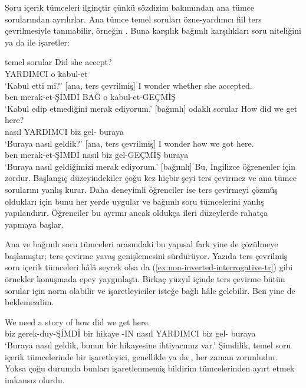 \label{sec:sub-interrog-tr}

Soru içerik tümceleri ilginçtir çünkü sözdizim bakımından ana tümce sorularından ayrılırlar. Ana tümce temel soruları özne-yardımcı fiil ters çevrilmesiyle tanınabilir, örneğin . Buna karşılık bağımlı karşılıkları soru niteliğini  ya da  ile işaretler:

\ea temel sorular\label{ex:int-sub-tr}
    \ea \gll Did she accept?\\
        YARDIMCI o kabul-et\\
    \glt `Kabul etti mi?' [ana, ters çevrilmiş]
    \ex \gll I wonder {\ob}whether she accepted{\cb}.\\
        ben merak-et-ŞİMDİ BAĞ o kabul-et-GEÇMİŞ\\
    \glt `Kabul edip etmediğini merak ediyorum.' [bağımlı]
    \z
\z
\ea odaklı sorular
    \ea \gll How did we get here?\\
        nasıl YARDIMCI biz gel- buraya\\
    \glt `Buraya nasıl geldik?' [ana, ters çevrilmiş]
    \ex \gll I wonder {\ob}how we got here{\cb}.\\
        ben merak-et-ŞİMDİ nasıl biz gel-GEÇMİŞ buraya\\
    \glt `Buraya nasıl geldiğimizi merak ediyorum.' [bağımlı]
    \z
\z
Bu, İngilizce öğrenenler için zordur. Başlangıç düzeyindekiler çoğu kez hiçbir şeyi ters çevirmez ve ana tümce sorularını yanlış kurar. Daha deneyimli öğrenciler ise ters çevirmeyi çözmüş oldukları için bunu her yerde uygular ve bağımlı soru tümcelerini yanlış yapılandırır. Öğrenciler bu ayrımı ancak oldukça ileri düzeylerde rahatça yapmaya başlar.

Ana ve bağımlı soru tümceleri arasındaki bu yapısal fark yine de çözülmeye başlamıştır; ters çevirme yavaş genişlemesini sürdürüyor. Yazıda ters çevrilmiş soru içerik tümceleri hâlâ seyrek olsa da (\ref{ex:non-inverted-interrogative-tr}) gibi örnekler konuşmada epey yaygınlaştı. Birkaç yüzyıl içinde ters çevirme bütün sorular için norm olabilir ve işaretleyiciler isteğe bağlı hâle gelebilir. Ben yine de beklemezdim.

\ea\label{ex:non-inverted-interrogative-tr}
\gll We need a story of {\ob}how did we get here{\cb}.\\
    biz gerek-duy-ŞİMDİ bir hikaye -IN nasıl YARDIMCI biz gel- buraya\\
\glt `Buraya nasıl geldik, bunun bir hikayesine ihtiyacımız var.'
\z
Şimdilik, temel soru içerik tümcelerinde bir işaretleyici, genellikle  ya da , her zaman zorunludur. Yoksa çoğu durumda bunları işaretlenmemiş bildirim tümcelerinden ayırt etmek imkansız olurdu.

